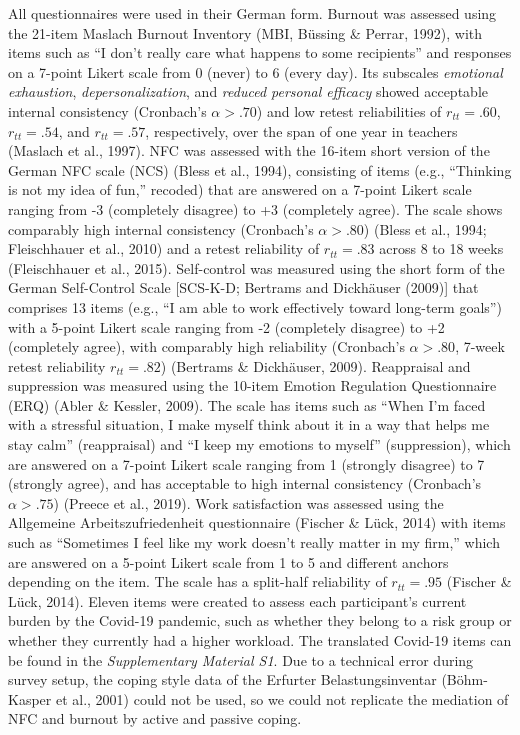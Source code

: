 \documentclass[
  english,
  man,floatsintext]{apa6}
\begin{document}
All questionnaires were used in their German form.
Burnout was assessed using the 21-item Maslach Burnout Inventory (MBI, Büssing \& Perrar, 1992), with items such as ``I don't really care what happens to some recipients'' and responses on a 7-point Likert scale from 0 (never) to 6 (every day).
Its subscales \emph{emotional exhaustion}, \emph{depersonalization}, and \emph{reduced personal efficacy} showed acceptable internal consistency (Cronbach's \(\alpha>.70\)) and low retest reliabilities of \(r_{tt}=.60\), \(r_{tt}=.54\), and \(r_{tt}=.57\), respectively, over the span of one year in teachers (Maslach et al., 1997).
NFC was assessed with the 16-item short version of the German NFC scale (NCS) (Bless et al., 1994), consisting of items (e.g., ``Thinking is not my idea of fun,'' recoded) that are answered on a 7-point Likert scale ranging from -3 (completely disagree) to +3 (completely agree).
The scale shows comparably high internal consistency (Cronbach's \(\alpha>.80\)) (Bless et al., 1994; Fleischhauer et al., 2010) and a retest reliability of \(r_{tt}=.83\) across 8 to 18 weeks (Fleischhauer et al., 2015).
Self-control was measured using the short form of the German Self-Control Scale {[}SCS-K-D; Bertrams and Dickhäuser (2009){]} that comprises 13 items (e.g., ``I am able to work effectively toward long-term goals'') with a 5-point Likert scale ranging from -2 (completely disagree) to +2 (completely agree), with comparably high reliability (Cronbach's \(\alpha>.80\), 7-week retest reliability \(r_{tt}=.82\)) (Bertrams \& Dickhäuser, 2009).
Reappraisal and suppression was measured using the 10-item Emotion Regulation Questionnaire (ERQ) (Abler \& Kessler, 2009).
The scale has items such as ``When I'm faced with a stressful situation, I make myself think about it in a way that helps me stay calm'' (reappraisal) and ``I keep my emotions to myself'' (suppression), which are answered on a 7-point Likert scale ranging from 1 (strongly disagree) to 7 (strongly agree), and has acceptable to high internal consistency (Cronbach's \(\alpha>.75\)) (Preece et al., 2019).
Work satisfaction was assessed using the Allgemeine Arbeitszufriedenheit questionnaire (Fischer \& Lück, 2014) with items such as ``Sometimes I feel like my work doesn't really matter in my firm,'' which are answered on a 5-point Likert scale from 1 to 5 and different anchors depending on the item.
The scale has a split-half reliability of \(r_{tt}=.95\) (Fischer \& Lück, 2014).
Eleven items were created to assess each participant's current burden by the Covid-19 pandemic, such as whether they belong to a risk group or whether they currently had a higher workload.
The translated Covid-19 items can be found in the \emph{Supplementary Material S1}.
Due to a technical error during survey setup, the coping style data of the Erfurter Belastungsinventar (Böhm-Kasper et al., 2001) could not be used, so we could not replicate the mediation of NFC and burnout by active and passive coping.
\end{document}
